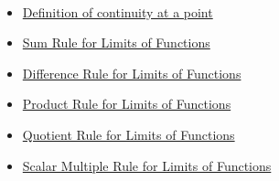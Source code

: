 \begin{remark*}[Dependencies]~\\
\begin{itemize}
  \item \hyperref[def:continuous-at-a-point]{Definition of continuity at a point}
  \item \hyperref[thm:limit-function-sum]{Sum Rule for Limits of Functions}
  \item \hyperref[thm:limit-function-difference]{Difference Rule for Limits of Functions}
  \item \hyperref[thm:limit-function-product]{Product Rule for Limits of Functions}
  \item \hyperref[thm:limit-function-quotient]{Quotient Rule for Limits of Functions}
  \item \hyperref[thm:limit-function-scalar]{Scalar Multiple Rule for Limits of Functions}
\end{itemize}
\end{remark*}
